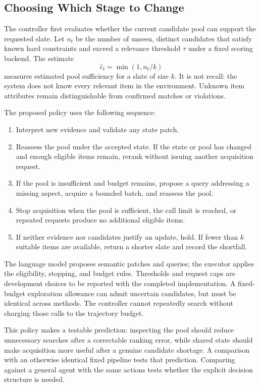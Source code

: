 \documentclass[11pt]{article}
\begin{document}
\subsection{Choosing Which Stage to Change}

The controller first evaluates whether the current candidate pool can support the requested slate. Let $n_t$ be the number of unseen, distinct candidates that satisfy known hard constraints and exceed a relevance threshold $\tau$ under a fixed scoring backend. The estimate
\begin{equation}
\widehat{c}_t=\min(1,n_t/k)
\end{equation}
measures estimated pool sufficiency for a slate of size $k$. It is not recall: the system does not know every relevant item in the environment. Unknown item attributes remain distinguishable from confirmed matches or violations.

The proposed policy uses the following sequence:
\begin{enumerate}
    \item Interpret new evidence and validate any state patch.
    \item Reassess the pool under the accepted state. If the state or pool has changed and enough eligible items remain, rerank without issuing another acquisition request.
    \item If the pool is insufficient and budget remains, propose a query addressing a missing aspect, acquire a bounded batch, and reassess the pool.
    \item Stop acquisition when the pool is sufficient, the call limit is reached, or repeated requests produce no additional eligible items.
    \item If neither evidence nor candidates justify an update, hold. If fewer than $k$ suitable items are available, return a shorter slate and record the shortfall.
\end{enumerate}

The language model proposes semantic patches and queries; the executor applies the eligibility, stopping, and budget rules. Thresholds and request caps are development choices to be reported with the completed implementation. A fixed-budget exploration allowance can admit uncertain candidates, but must be identical across methods. The controller cannot repeatedly search without charging those calls to the trajectory budget.

This policy makes a testable prediction: inspecting the pool should reduce unnecessary searches after a correctable ranking error, while shared state should make acquisition more useful after a genuine candidate shortage. A comparison with an otherwise identical fixed pipeline tests that prediction. Comparing against a general agent with the same actions tests whether the explicit decision structure is needed.
\end{document}
